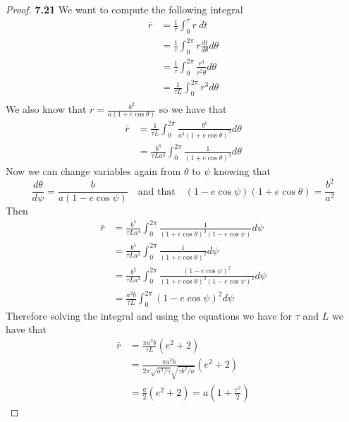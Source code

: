 \documentclass[11pt]{article}
\theoremstyle{definition}
\begin{document}
    \begin{proof}{\textbf{7.21}}
        We want to compute the following integral
        \begin{align*}
            \bar{r} &= \frac{1}{\tau}\int_0^\tau r~dt\\
                &= \frac{1}{\tau}\int_0^{2\pi} r\frac{dt}{d\theta}d\theta\\
                &= \frac{1}{\tau}\int_0^{2\pi} \frac{r^3}{r^2\dot{\theta}}d\theta\\
                &= \frac{1}{\tau L}\int_0^{2\pi} r^3 d\theta\\
        \end{align*}
        We also know that $r = \frac{b^2}{a(1+e\cos\theta)}$ so we have that
        \begin{align*}
            \bar{r} &= \frac{1}{\tau L}\int_0^{2\pi} \frac{b^6}{a^3(1+e\cos\theta)^3} d\theta\\
                &= \frac{b^6}{\tau La^3}\int_0^{2\pi} \frac{1}{(1+e\cos\theta)^3} d\theta
        \end{align*}
        Now we can change variables again from $\theta$ to $\psi$ knowing that
        $$\frac{d\theta}{d\psi} = \frac{b}{a(1-e\cos\psi)} \quad\text{and that}\quad
        (1-e\cos\psi)(1+e\cos\theta) = \frac{b^2}{a^2}$$
        Then
        \begin{align*}
            \bar{r} &= \frac{b^7}{\tau La^4}\int_0^{2\pi} \frac{1}{(1+e\cos\theta)^3(1-e\cos\psi)}
                 d\psi\\
                 &= \frac{b^5}{\tau La^2}\int_0^{2\pi} \frac{1}{(1+e\cos\theta)^2} d\psi\\
                 &= \frac{b^5}{\tau La^2}\int_0^{2\pi} \frac{(1-e\cos\psi)^2}{(1+e\cos\theta)^2(1-e\cos\psi)^2}
                 d\psi\\
                 &= \frac{a^2b}{\tau L}\int_0^{2\pi} (1-e\cos\psi)^2 d\psi
        \end{align*}
        Therefore solving the integral and using the equations we have for $\tau$ and $L$ 
        we have that
        \begin{align*}
            \bar{r} &= \frac{\pi a^2 b}{\tau L}(e^2+2)\\
                &= \frac{\pi a^2 b}{2\pi \sqrt{a^3/\gamma} \sqrt{\gamma b^2/a}}(e^2+2)\\
                &= \frac{a}{2}(e^2+2) = a (1+\frac{e^2}{2})
        \end{align*}

    \end{proof}
\end{document}

